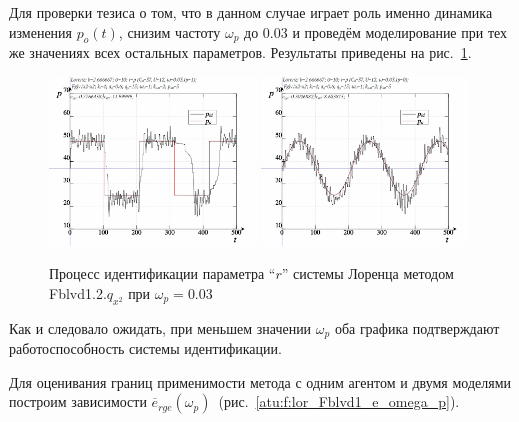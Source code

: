 Для проверки тезиса о том, что в данном случае играет роль
именно динамика изменения $p_o(t)$, снизим частоту $\omega_p$ до $0.03$
и проведём моделирование при тех же значениях
всех остальных параметров. Результаты приведены на рис.~\ref{atu:f:lor_id_Fblvd1_003}.

\begin{figure}[h!]
  \centerline{
    \includegraphics[width=0.49\textwidth]{p/cha/lor/Fblvd1_2/Fblvd1_2-p_xz_1_wp003.png}
    \hfill
    \includegraphics[width=0.49\textwidth]{p/cha/lor/Fblvd1_2/Fblvd1_2-p_xz_0_wp003.png}
  }
  \caption{Процесс идентификации параметра ``$r$'' системы Лоренца методом Fblvd1.2.$q_{x^2}$ при $\omega_p=0.03$}
  \label{atu:f:lor_id_Fblvd1_003}
\end{figure}

Как и следовало ожидать, при меньшем значении $\omega_p$
оба графика подтверждают работоспособность системы идентификации.

Для оценивания границ применимости метода с одним агентом
и двумя моделями построим зависимости
$\overline{e}_{rge}(\omega_p)$~(рис.~\ref{atu:f:lor_Fblvd1_e_omega_p}).

